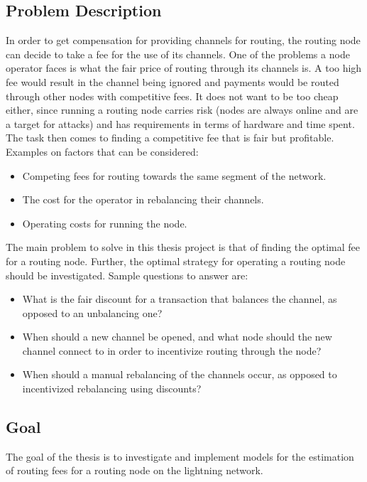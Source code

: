 \documentclass[10pt, titlepage, oneside, a4paper]{article}
\begin{document}
\subsection{Problem Description}

In order to get compensation for providing channels for routing, the routing node
can decide to take a fee for the use of its channels. One of the problems a node
operator faces is what the fair price of routing through its channels is. A too high
fee would result in the channel being ignored and payments would be routed
through other nodes with competitive fees. It does not want to be too cheap
either, since running a routing node carries risk (nodes are always online and are
a target for attacks) and has requirements in terms of hardware and time spent.
The task then comes to finding a competitive fee that is fair but profitable.
Examples on factors that can be considered:
\begin{itemize}
	\item Competing fees for routing towards the same segment of the network.
	\item The cost for the operator in rebalancing their channels.
	\item Operating costs for running the node.
\end{itemize}
The main problem to solve in this thesis project is that of finding the optimal fee
for a routing node.
Further, the optimal strategy for operating a routing node should be
investigated. Sample questions to answer are:
\begin{itemize}
	\item What is the fair discount for a transaction that balances the channel, as
	opposed to an unbalancing one?
	\item When should a new channel be opened, and what node should the new
	channel connect to in order to incentivize routing through the node?
	\item When should a manual rebalancing of the channels occur, as opposed to
	incentivized rebalancing using discounts?
\end{itemize}

\subsection{Goal}

The goal of the thesis is to investigate and implement models for the
estimation of routing fees for a routing node on the lightning network.
\end{document}
